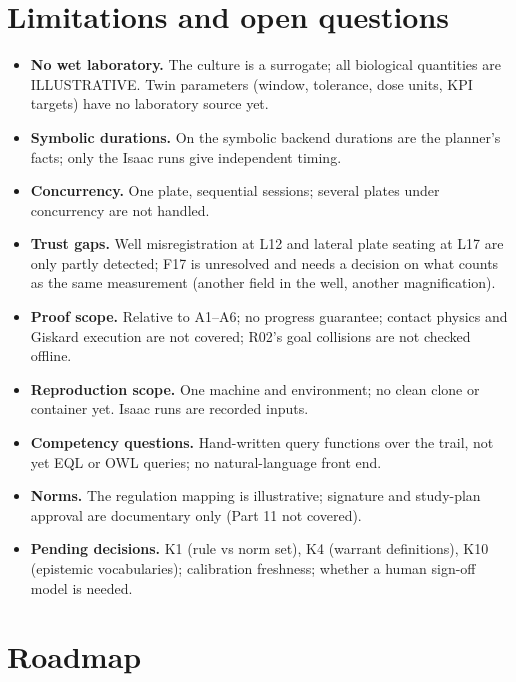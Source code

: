 \documentclass[10pt,a4paper]{article}
\begin{document}
\section{Limitations and open questions}\label{sec:limits}

\begin{itemize}
  \item \textbf{No wet laboratory.} The culture is a surrogate; all biological quantities are ILLUSTRATIVE. Twin parameters (window, tolerance, dose units, KPI targets) have no laboratory source yet.
  \item \textbf{Symbolic durations.} On the symbolic backend durations are the planner's facts; only the Isaac runs give independent timing.
  \item \textbf{Concurrency.} One plate, sequential sessions; several plates under concurrency are not handled.
  \item \textbf{Trust gaps.} Well misregistration at L12 and lateral plate seating at L17 are only partly detected; F17 is unresolved and needs a decision on what counts as the same measurement (another field in the well, another magnification).
  \item \textbf{Proof scope.} Relative to A1–A6; no progress guarantee; contact physics and Giskard execution are not covered; R02's goal collisions are not checked offline.
  \item \textbf{Reproduction scope.} One machine and environment; no clean clone or container yet. Isaac runs are recorded inputs.
  \item \textbf{Competency questions.} Hand-written query functions over the trail, not yet EQL or OWL queries; no natural-language front end.
  \item \textbf{Norms.} The regulation mapping is illustrative; signature and study-plan approval are documentary only (Part 11 not covered).
  \item \textbf{Pending decisions.} K1 (rule vs norm set), K4 (warrant definitions), K10 (epistemic vocabularies); calibration freshness; whether a human sign-off model is needed.
\end{itemize}

\section{Roadmap}\label{sec:roadmap}
\end{document}
